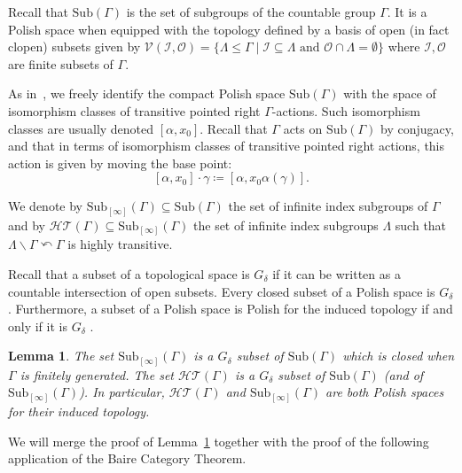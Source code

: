 \documentclass[12pt]{article}
\numberwithin{equation}{section}
\newtheorem{lemma}[equation]{Lemma}
\theoremstyle{definition}
\newcommand{\Ic}{\mathcal{I}}
\newcommand{\Oc}{\mathcal{O}}
\newcommand{\Vc}{\mathcal{V}}
\newcommand{\Sub}{\mathrm{Sub}}
\newcommand{\bs}{\backslash}
\begin{document}
Recall that \(\Sub(\Gamma)\) is the set of subgroups of the countable group $\Gamma$. It is a Polish space when equipped with the topology defined by a basis of open (in fact clopen) subsets given by \(\Vc(\Ic,\Oc)=\{\Lambda\leq \Gamma\mid \Ic\subseteq \Lambda \text{ and } \Oc\cap \Lambda=\emptyset\}\)
where \(\Ic,\Oc\) are finite subsets of $\Gamma$.

   As in~\cite[Section~2.2]{CGLMS-22}, we freely identify the compact Polish space \(\Sub(\Gamma)\) 
with the space of isomorphism classes of transitive pointed
right \( \Gamma \)-actions. Such isomorphism classes are usually denoted \([\alpha,x_0]\).
Recall that \( \Gamma \) acts on \(\Sub(\Gamma)\) by conjugacy, and that in terms 
of isomorphism classes of transitive pointed right actions, this action is given by moving the base point: 
\[[\alpha,x_0]\cdot \gamma \coloneqq [\alpha,x_0\alpha(\gamma)].\]



We denote by \(\Sub_{[\infty]}(\Gamma)\subseteq\Sub(\Gamma)\) the set of infinite index subgroups of \( \Gamma \) and by 
\(\mathcal{HT}(\Gamma)\subseteq \Sub_{[\infty]}(\Gamma)\) the set of infinite index subgroups $\Lambda$ such that $\Lambda\bs \Gamma \curvearrowleft \Gamma$ is highly transitive.

Recall that a subset of a topological space is $G_\delta$ 
if it can be written as a countable intersection
of open subsets. 
Every closed subset of a Polish space is \(G_\delta\).
Furthermore, a subset of a Polish space is Polish for the induced topology
if and only if it is \( G_\delta \) \cite[Theorem~3.11]{kechris_classical_1995}. 

\begin{lemma}
\label{lem: Sub infty and HT are Gdelta}
The set  \(\Sub_{[\infty]}(\Gamma)\) is a $G_\delta$ subset of \(\Sub(\Gamma)\)
which is closed when $\Gamma$ is finitely generated.
The set \(\mathcal{HT}(\Gamma)\) is a \( G_\delta \) subset of \(\Sub(\Gamma)\) 
(and of \(\Sub_{[\infty]}(\Gamma)\)).
In particular, \(\mathcal{HT}(\Gamma)\) and  \(\Sub_{[\infty]}(\Gamma)\) are both 
Polish spaces for their induced topology.
\end{lemma}

We will merge the proof of Lemma~\ref{lem: Sub infty and HT are Gdelta} together with the proof of the following application of the Baire Category Theorem.
\end{document}

